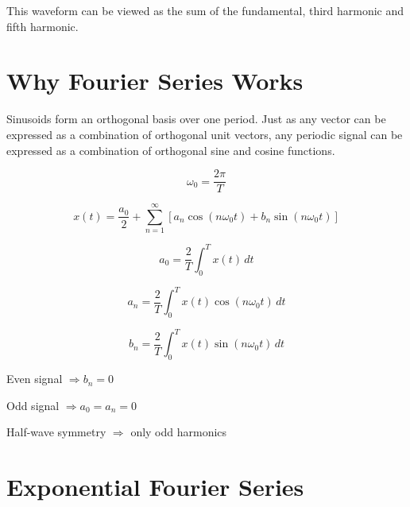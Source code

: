 \begin{center}
\end{center}

This waveform can be viewed as the sum of the fundamental, third harmonic and
fifth harmonic.


\section{Why Fourier Series Works}

Sinusoids form an orthogonal basis over one period. Just as any vector can be
expressed as a combination of orthogonal unit vectors, any periodic signal can
be expressed as a combination of orthogonal sine and cosine functions.


\begin{tcolorbox}[title=Quick Recall,colback=blue!5]

\[
\omega_0=\frac{2\pi}{T}
\]

\[
x(t)=
\frac{a_0}{2}
+\sum_{n=1}^{\infty}
\left[
a_n\cos(n\omega_0 t)+b_n\sin(n\omega_0 t)
\right]
\]

\[
a_0=
\frac{2}{T}\int_0^T x(t)\,dt
\]

\[
a_n=
\frac{2}{T}\int_0^T x(t)\cos(n\omega_0 t)\,dt
\]

\[
b_n=
\frac{2}{T}\int_0^T x(t)\sin(n\omega_0 t)\,dt
\]

Even signal \(\Rightarrow b_n=0\)

Odd signal \(\Rightarrow a_0=a_n=0\)

Half-wave symmetry \(\Rightarrow\) only odd harmonics

\end{tcolorbox}
\section{Exponential Fourier Series}

